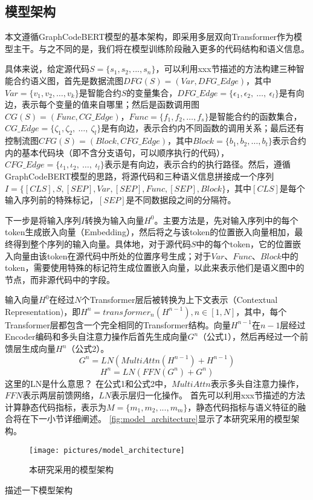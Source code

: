 \subsection{模型架构}
本文遵循GraphCodeBERT模型的基本架构，即采用多层双向Transformer作为模型主干。与之不同的是，我们将在模型训练阶段融入更多的代码结构和语义信息。

具体来说，给定源代码$S=\{s_{1},s_{2},...,s_{n}\}$，可以利用xxx节描述的方法构建三种智能合约语义图，首先是数据流图$DFG(S)=(Var,DFG\_Edge)$，其中$Var=\{v_1,v_2,\ldots,v_k\}$是智能合约$S$的变量集合，$DFG\_Edge=\{\epsilon_1,\epsilon_2,~\ldots,~\epsilon_l\}$是有向边，表示每个变量的值来自哪里；然后是函数调用图$CG(S)=(Func,CG\_Edge)$，$Func=\{f_1,f_2,\ldots,f_s\}$是智能合约的函数集合，$CG\_Edge=\{\zeta_1,\zeta_2,~\ldots,~\zeta_l\}$是有向边，表示合约内不同函数的调用关系；最后还有控制流图$CFG(S)=(Block,CFG\_Edge)$，其中$Block=\{b_1,b_2,\ldots,b_t\}$表示合约内的基本代码块（即不含分支语句，可以顺序执行的代码），$CFG\_Edge=\{\iota_1,\iota_2,~\ldots,~\iota_l\}$表示是有向边，表示合约的执行路径。然后，遵循GraphCodeBERT模型的思路，将源代码和三种语义信息拼接成一个序列$I=\{[CLS],S,[SEP],Var,[SEP],Func,[SEP],Block\}$，其中$[CLS]$是每个输入序列前的特殊标记，$[SEP]$是不同数据段之间的分隔符。


下一步是将输入序列$I$转换为输入向量$H^0$。主要方法是，先对输入序列中的每个token生成嵌入向量（Embedding），然后将之与该token的位置嵌入向量相加，最终得到整个序列的输入向量。具体地，对于源代码$S$中的每个token，它的位置嵌入向量由该token在源代码中所处的位置序号生成；对于$Var$、$Func$、$Block$中的token，需要使用特殊的标记符生成位置嵌入向量，以此来表示他们是语义图中的节点，而非源代码中的字段。

输入向量$H^0$在经过$N$个Transformer层后被转换为上下文表示（Contextual Representation)，即$H^n=transformer_n(H^{n-1}),n\in[1,N]$，其中，每个Transformer层都包含一个完全相同的Transformer结构。向量$H^{n-1}$在$n-1$层经过Encoder编码和多头自注意力操作\cite{attention}后首先生成向量$G^n$（公式1），然后再经过一个前馈层生成向量$H^n$（公式2）。
$$G^n=LN(MultiAttn(H^{n-1})+H^{n-1})$$
$$H^n=LN(FFN(G^n)+G^n)$$
这里的LN是什么意思？
在公式1和公式2中，$MultiAttn$表示多头自注意力操作，$FFN$表示两层前馈网络，$LN$表示层归一化操作。
首先可以利用xxx节描述的方法计算静态代码指标，表示为$M=\{m_{1},m_{2},...,m_{m}\}$，静态代码指标与语义特征的融合将在下一小节详细阐述。
\autoref{fig:model_architecture}显示了本研究采用的模型架构。
\begin{figure}[htbp]
    \centering
    \texttt{[image: pictures/model\_architecture]}
    \caption{\label{fig:model_architecture}本研究采用的模型架构}
\end{figure}
描述一下模型架构
